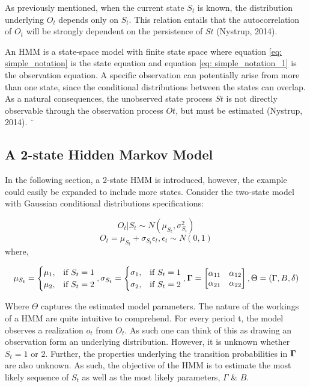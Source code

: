 As previously mentioned, when the current state $S_t$ is known, the distribution underlying $O_t$ depends only on $S_t$. This relation entails that the autocorrelation of {$O_t$} will be strongly dependent on the
persistence of $St$ (Nystrup, 2014).

An HMM is a state-space model with finite state space where equation \ref{eq: simple_notation} is the state equation and equation \ref{eq: simple_notation_1} is the observation equation. A specific observation can potentially arise from more than one state, since the conditional distributions between the states can overlap. As a natural consequences, the unobserved state process $St$ is  not directly observable through the observation process $Ot$, but must be estimated (Nystrup, 2014).
¨
\subsection{A 2-state Hidden Markov Model}
In the following section, a 2-state HMM is introduced, however, the example could easily be expanded to include more states. Consider the two-state model with Gaussian conditional distributions specifications:

\begin{equation}
     O_t|S_t \sim N(\mu_{S_t},\sigma^2_{S_t}) 
\end{equation}
\begin{equation}
   O_t = \mu_{S_t}  + \sigma_{S_t}\epsilon_{t}, \epsilon_{t} \sim N(0,1)   
\end{equation}
where,

$$
\mu_{S_t}=
\begin{cases}
    \mu_1, & \text{if}\ S_t = 1 \\
    \mu_2, & \text{if}\ S_t = 2
\end{cases},
\sigma_{S_t} =
\begin{cases}
    \sigma_1, & \text{if}\ S_t = 1 \\
    \sigma_2, & \text{if}\ S_t = 2
\end{cases},
\bold{\Gamma} = 
\begin{bmatrix}
\alpha_{11} & \alpha_{12} \\
\alpha_{21} & \alpha_{22}
\end{bmatrix},
\Theta = (\Gamma, B, \delta)
$$

Where $\Theta$ captures the estimated model parameters. The nature of the workings of a HMM are quite intuitive to comprehend. For every period t, the model observes a realization $o_t$ from $O_t$. As such one can think of this as drawing an observation form an underlying distribution. However, it is unknown whether $S_t = 1$ or $2$. Further, the properties underlying the transition probabilities in $\bold{\Gamma}$ are also unknown. As such, the objective of the HMM is to estimate the most likely sequence of $S_t$ as well as the most likely parameters, $\Gamma$ \& $B$. 


